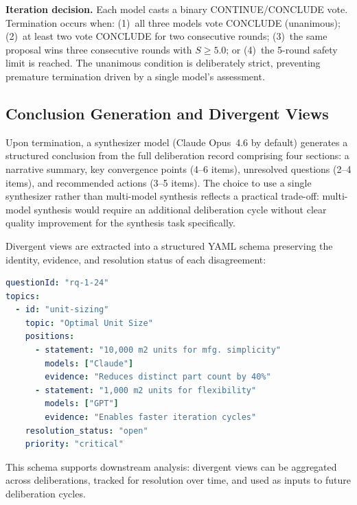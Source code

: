 \documentclass[11pt,a4paper]{article}
\begin{document}
\textbf{Iteration decision.} Each model casts a binary CONTINUE/CONCLUDE vote. Termination occurs when: (1)~all three models vote CONCLUDE (unanimous); (2)~at least two vote CONCLUDE for two consecutive rounds; (3)~the same proposal wins three consecutive rounds with $S \geq 5.0$; or (4)~the 5-round safety limit is reached. The unanimous condition is deliberately strict, preventing premature termination driven by a single model's assessment.

\subsection{Conclusion Generation and Divergent Views}
\label{sec:conclusion_divergent}

Upon termination, a synthesizer model (Claude Opus~4.6 by default) generates a structured conclusion from the full deliberation record comprising four sections: a narrative summary, key convergence points (4--6 items), unresolved questions (2--4 items), and recommended actions (3--5 items). The choice to use a single synthesizer rather than multi-model synthesis reflects a practical trade-off: multi-model synthesis would require an additional deliberation cycle without clear quality improvement for the synthesis task specifically.

Divergent views are extracted into a structured YAML schema preserving the identity, evidence, and resolution status of each disagreement:

\begin{lstlisting}[language=yaml,caption={Divergent views schema with model attribution.}]
questionId: "rq-1-24"
topics:
  - id: "unit-sizing"
    topic: "Optimal Unit Size"
    positions:
      - statement: "10,000 m2 units for mfg. simplicity"
        models: ["Claude"]
        evidence: "Reduces distinct part count by 40%"
      - statement: "1,000 m2 units for flexibility"
        models: ["GPT"]
        evidence: "Enables faster iteration cycles"
    resolution_status: "open"
    priority: "critical"
\end{lstlisting}

This schema supports downstream analysis: divergent views can be aggregated across deliberations, tracked for resolution over time, and used as inputs to future deliberation cycles.
\end{document}
